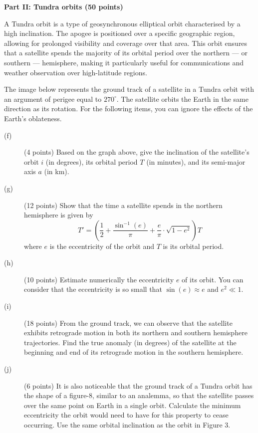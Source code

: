 \textbf{Part II: Tundra orbits (50 points)}

A Tundra orbit is a type of geosynchronous elliptical orbit characterised by a
high inclination. The apogee is positioned over a specific geographic region,
allowing for prolonged visibility and coverage over that area. This orbit
ensures that a satellite spends the majority of its orbital period over the
northern --- or southern --- hemisphere, making it particularly useful for
communications and weather observation over high-latitude regions.

The image below represents the ground track of a satellite in a Tundra orbit
with an argument of perigee equal to $270^\circ$. The satellite orbits the
Earth in the same direction as its rotation. For the following items, you can
ignore the effects of the Earth's oblateness.

\begin{description}
\item[(f)] (4 points) Based on the graph above, give the inclination of the
  satellite's orbit $i$ (in degrees), its orbital period $T$ (in minutes), and
  its semi-major axis $a$ (in km).
\item[(g)] (12 points) Show that the time a satellite spends in the northern
  hemisphere is given by
  \[ T' = \left( \frac{1}{2} + \frac{\sin^{-1}(e)}{\pi}
     + \frac{e}{\pi}\cdot\sqrt{1 - e^2} \right) T \]
  where $e$ is the eccentricity of the orbit and $T$ is its orbital period.
\item[(h)] (10 points) Estimate numerically the eccentricity $e$ of its orbit.
  You can consider that the eccentricity is so small that
  $\sin(e) \approx e$ and $e^2 \ll 1$.
\item[(i)] (18 points) From the ground track, we can observe that the
  satellite exhibits retrograde motion in both its northern and southern
  hemisphere trajectories. Find the true anomaly (in degrees) of the satellite
  at the beginning and end of its retrograde motion in the southern
  hemisphere.
\item[(j)] (6 points) It is also noticeable that the ground track of a Tundra
  orbit has the shape of a figure-8, similar to an analemma, so that the
  satellite passes over the same point on Earth in a single orbit. Calculate
  the minimum eccentricity the orbit would need to have for this property to
  cease occurring. Use the same orbital inclination as the orbit in Figure 3.
\end{description}
